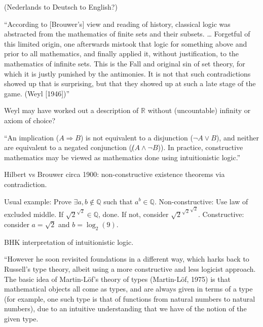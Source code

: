 (Nederlands to Deutsch to English?)

``According to [Brouwer’s] view and reading of history, 
classical logic was abstracted 
from the mathematics of finite sets and their subsets. \ldots 
Forgetful of this limited origin, 
one afterwards mistook that logic 
for something above and prior to all mathematics, 
and finally applied it, without justification, 
to the mathematics of infinite sets. 
This is the Fall and original sin of set theory, 
for which it is justly punished by the antimonies. 
It is not that such contradictions showed up that is surprising,
 but that they showed up at such a late stage of the game. 
 (Weyl [1946])''
 
Weyl may have worked out a description of
$\mathbb{R}$ without (uncountable) infinity or
axiom of choice?

\label{sec:Constructivism_IEP}
\cite{iep:Constructive_mathematics}

``An implication ($A \Rightarrow B$) is not equivalent 
to a disjunction ($\lnot A \vee B$), 
and neither are equivalent to a negated conjunction 
($\not (A \wedge \lnot B$)). 
In practice, constructive mathematics may be viewed 
as mathematics done using intuitionistic 
logic.''\cite{iep:Constructive_mathematics}

Hilbert vs Brouwer circa 1900: 
non-constructive existence theorems via contradiction.

Usual example: Prove $\exists a,b \notin \mathbb{Q}$
such that $a^b \in \mathbb{Q}$. \hfill\break
Non-constructive: Use law of excluded middle.
If $\sqrt{2}^{\sqrt{2}} \in \mathbb{Q}$, done.
If not, consider ${\sqrt{2}^{\sqrt{2}}}^{\sqrt{2}}$.
\hfill\break
Constructive: consider $a=\sqrt{2}$ and $b=\log_2(9)$.

BHK interpretation of intuitionistic 
logic\cite{wiki:Brouwer_Heyting_Kolmogorov_interpretation}.

\label{sec:Martin_Lof_IEP}

``However he soon revisited foundations in a different way, 
which harks back to Russell's type theory, 
albeit using a more constructive and less logicist approach. 
The basic idea of Martin-Löf's theory of types (Martin-Löf, 1975) 
is
that mathematical objects all come as types, 
and are always given in terms of a
type (for example, one such type is that of functions 
from natural numbers to
natural numbers), due to an intuitive understanding 
that we have of the notion
of the given type.

